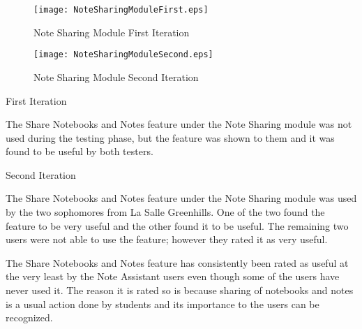 \begin{figure}[htbp!]
   \centering
   \texttt{[image: NoteSharingModuleFirst.eps]} 
   \caption{Note Sharing Module First Iteration}
   \label{fig:notesharingmodulefirst}
\end{figure}

\pagebreak

\begin{figure}[htbp!]
   \centering
   \texttt{[image: NoteSharingModuleSecond.eps]} 
   \caption{Note Sharing Module Second Iteration}
   \label{fig:notesharingmodulesecond}
\end{figure}

\begin{flushleft}
First Iteration
\end{flushleft}

\begin{raggedright}
The Share Notebooks and Notes feature under the Note Sharing module was not used during the testing phase, but the feature was shown to them and it was found to be useful by both testers.
\end{raggedright} 

\begin{flushleft}
Second Iteration
\end{flushleft}

\begin{raggedright}
The Share Notebooks and Notes feature under the Note Sharing module was used by the two sophomores from La Salle Greenhills. One of the two found the feature to be very useful and the other found it to be useful. The remaining two users were not able to use the feature; however they rated it as very useful.
\end{raggedright}

The Share Notebooks and Notes feature has consistently been rated as useful at the very least by the Note Assistant users even though some of the users have never used it. The reason it is rated so is because sharing of notebooks and notes is a usual action done by students and its importance to the users can be recognized.

